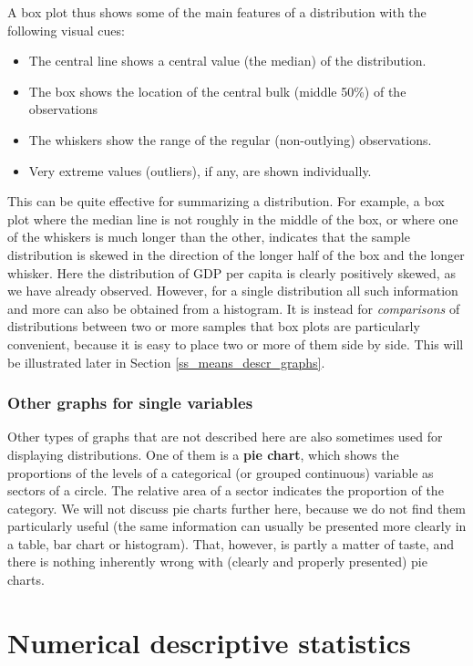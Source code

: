 A box plot thus shows some of the main features of a distribution with
the following visual cues:
\begin{itemize}
\item
The central line shows a central value (the median) of the distribution.
\item
The box shows the location of the central bulk (middle 50\%) of the
observations
\item
The whiskers show the range of the regular (non-outlying) observations.
\item
Very extreme values (outliers), if any, are shown individually.
\end{itemize}
This can be quite effective for summarizing a distribution. For example,
a box plot where the median line is not roughly in the middle of the
box, or where one of the whiskers is much longer than the other,
indicates that the sample distribution is skewed in the direction of the
longer half of the box and the longer whisker. Here the distribution of
GDP per capita is clearly positively skewed, as we have already observed.
However, for a single
distribution all such information and more can also be obtained from a
histogram. It is instead for \emph{comparisons} of distributions
between two or more samples that box plots
are particularly convenient, because it is easy to place two or more
of them side by side. This will be illustrated later in Section
\ref{ss_means_descr_graphs}.

\subsubsection{Other graphs for single variables}

Other types of graphs that are not described here are also
sometimes used for displaying distributions. One of them
is a \textbf{pie chart}, which shows the proportions of the levels of a
categorical (or grouped continuous) variable as sectors
of a circle. The relative area of a
sector indicates the proportion of the category.
We will not discuss pie charts further here, because we do not find them
particularly useful (the same information can usually be presented more
clearly in a table, bar chart or histogram). That, however, is
partly a matter of taste, and there is nothing inherently wrong with
(clearly and properly presented) pie charts.

\section{Numerical descriptive statistics}
\label{s_descr1_nums}

